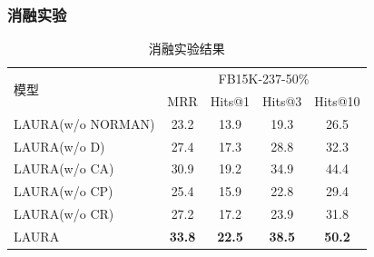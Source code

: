 \documentclass[algorithmlist, AutoFakeBold, AutoFakeSlant, figurelist, tablelist, nomlist, engineering, openany]{seuthesix} %
\begin{document}
\subsubsection{消融实验}
\begin{table}[t]
  \centering
  \caption{消融实验结果}
  \begin{tabular*}{0.95\textwidth}{@{\extracolsep{\fill}}lcccc}
    \toprule[1pt]
    \multirow{2}{*}{模型} & \multicolumn{4}{c}{FB15K-237-50\%} \\
      & MRR & Hits@1 & Hits@3 & Hits@10 \\ \hline
    LAURA(w/o NORMAN) & 23.2 & 13.9 & 19.3 & 26.5 \\
    LAURA(w/o D) & 27.4 & 17.3 & 28.8 & 32.3 \\
    LAURA(w/o CA) & 30.9 & 19.2 & 34.9 & 44.4 \\
    LAURA(w/o CP) & 25.4 & 15.9 & 22.8 & 29.4 \\
    LAURA(w/o CR) & 27.2 & 17.2 & 23.9 & 31.8 \\
    LAURA & \textbf{33.8} & \textbf{22.5} & \textbf{38.5} & \textbf{50.2} \\
    \bottomrule[1pt]
  \end{tabular*}
  \label{Experiment2_ablation}
\end{table}
\end{document}
